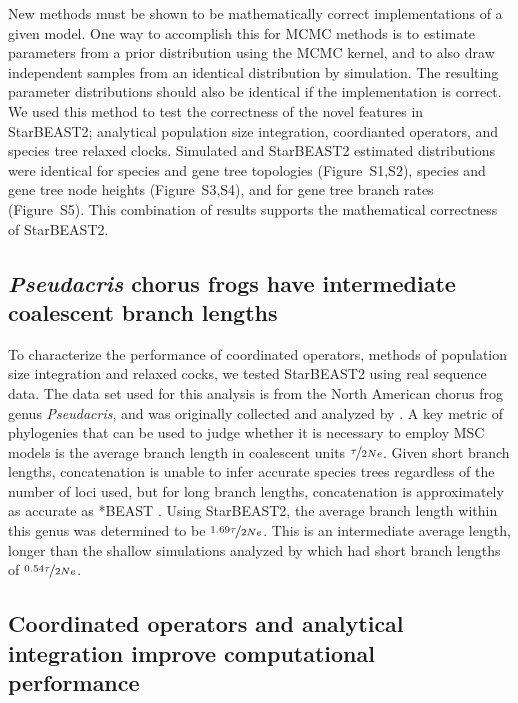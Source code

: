 \documentclass[12pt]{article}
\begin{document}
New methods must be shown to be mathematically correct implementations of a
given model. One way to accomplish this for MCMC methods is to estimate
parameters from a prior distribution using the MCMC kernel, and to also draw
independent samples from an identical distribution by simulation. The
resulting parameter distributions should also be identical if the implementation is
correct. We used this method to test the correctness of the novel features in
StarBEAST2; analytical population size integration, coordianted operators, and
species tree relaxed clocks. Simulated and StarBEAST2 estimated distributions
were identical for species and gene tree topologies (Figure~S1,S2), species and
gene tree node heights (Figure~S3,S4), and for gene tree branch rates (Figure~S5).
This combination of results supports the mathematical correctness of StarBEAST2.

\subsection*{\textit{Pseudacris} chorus frogs have intermediate coalescent branch lengths}

To characterize the performance of coordinated operators, methods of population size
integration and relaxed cocks, we tested StarBEAST2 using real sequence data.
The data set used for this analysis is from the North American chorus frog genus
\textit{Pseudacris}, and was originally collected and analyzed by
\cite{Barrow201478}. A key metric of phylogenies that can be used to judge
whether it is necessary to employ MSC models is the average
branch length in coalescent units $\nicefrac{\tau}{2Ne}$. Given short branch
lengths, concatenation is unable to infer accurate species trees regardless of
the number of loci used, but for long branch lengths, concatenation is
approximately as accurate as *BEAST \citep{Ogilvie01052016}. Using StarBEAST2,
the average branch length within this genus was determined to be
$\nicefrac{1.69\tau}{2Ne}$. This is an intermediate average length, longer than
the shallow simulations analyzed by \cite{Ogilvie01052016} which had short
branch lengths of $\nicefrac{0.54\tau}{2Ne}$.

\subsection*{Coordinated operators and analytical integration improve computational performance}
\end{document}
